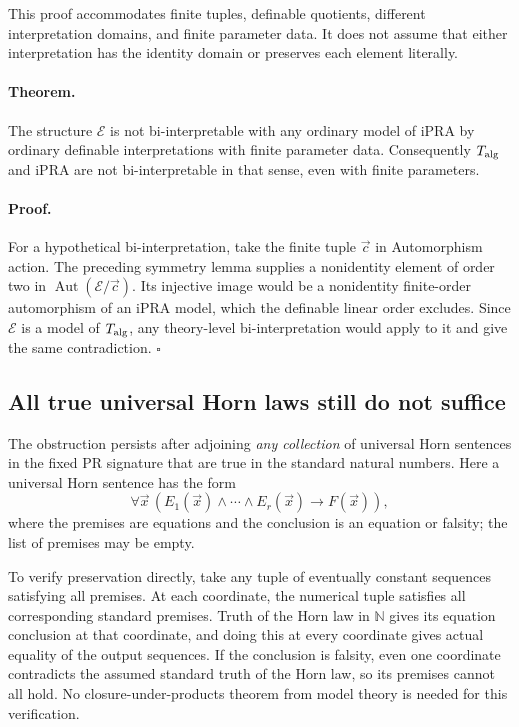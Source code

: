 This proof accommodates finite tuples, definable quotients, different
interpretation domains, and finite parameter data.  It does not assume
that either interpretation has the identity domain or preserves each
element literally.

\paragraph{Theorem.}
The structure $\mathcal E$ is not bi-interpretable with any ordinary
model of iPRA by ordinary definable interpretations with finite
parameter data.  Consequently $T_{\rm alg}$ and iPRA are not
bi-interpretable in that sense, even with finite parameters.

\paragraph{Proof.}
For a hypothetical bi-interpretation, take the finite tuple $\vec c$
in Automorphism action.  The preceding symmetry lemma supplies a
nonidentity element of order two in
$\operatorname{Aut}(\mathcal E/\vec c)$.  Its injective image would
be a nonidentity finite-order automorphism of an iPRA model, which
the definable linear order excludes.  Since $\mathcal E$ is a model
of $T_{\rm alg}$, any theory-level bi-interpretation would apply to it
and give the same contradiction.
\hfill$\square$

\subsection{All true universal Horn laws still do not suffice}

The obstruction persists after adjoining \emph{any collection} of
universal Horn sentences in the fixed PR signature that are true in
the standard natural numbers.  Here a universal Horn sentence has
the form
\[
 \forall\vec x\,
   (E_1(\vec x)\land\cdots\land E_r(\vec x)\to F(\vec x)),
\]
where the premises are equations and the conclusion is an equation
or falsity; the list of premises may be empty.

To verify preservation directly, take any tuple of eventually constant
sequences satisfying all premises.  At each coordinate, the numerical
tuple satisfies all corresponding standard premises.  Truth of the
Horn law in $\mathbb N$ gives its equation conclusion at that
coordinate, and doing this at every coordinate gives actual equality
of the output sequences.  If the conclusion is falsity, even one
coordinate contradicts the assumed standard truth of the Horn law,
so its premises cannot all hold.  No closure-under-products theorem
from model theory is needed for this verification.

